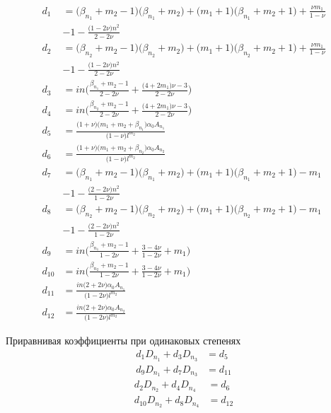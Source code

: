 \begin{equation*}
\begin{split}
	d_1 &= \big (\beta_{n_1}+m_2-1 \big ) \big (\beta_{n_1}+m_2\big )+ \big (m_1+1 \big ) \big (\beta_{n_1}+m_2+1 \big )+ \frac{\nu m_1}{1-\nu}\\
	& - 1 - \frac{\big (1-2\nu \big )n^2}{2-2\nu}\\
	d_2 & = \big (\beta_{n_2}+m_2-1 \big ) \big (\beta_{n_2}+m_2\big )+ \big (m_1+1 \big ) \big (\beta_{n_2}+m_2+1 \big )+ \frac{\nu m_1}{1-\nu}\\
	& - 1 - \frac{\big (1-2\nu \big )n^2}{2-2\nu}\\
	d_3 &= in \big ( \frac{\beta_{n_1}+m_2-1}{2-2\nu} + \frac{\big (4+2m_1 \big )\nu -3}{2-2\nu}  \big) \\
	d_4 &= in \big ( \frac{\beta_{n_2}+m_2-1}{2-2\nu} + \frac{\big (4+2m_1 \big )\nu -3}{2-2\nu}  \big) \\
	d_5 & = \frac{\big (1+\nu \big )\big (m_1+m_2+\beta_{n_1} \big ) \alpha_0 A_{n_1}}{\big ( 1-\nu \big )l^{m_2}} \\
	d_6 & = \frac{\big (1+\nu \big )\big (m_1+m_2+\beta_{n_2} \big ) \alpha_0 A_{n_2}}{\big ( 1-\nu \big )l^{m_2}} \\
	d_7 & =  \big (\beta_{n_1}+m_2-1 \big ) \big (\beta_{n_1}+m_2\big )+ \big (m_1+1 \big ) \big (\beta_{n_1}+m_2+1 \big ) -m_1 \\
		& - 1 - \frac{\big (2-2\nu \big )n^2}{1-2\nu}\\
	d_8 & =  \big (\beta_{n_2}+m_2-1 \big ) \big (\beta_{n_2}+m_2\big )+ \big (m_1+1 \big ) \big (\beta_{n_2}+m_2+1 \big ) -m_1 \\
		& - 1 - \frac{\big (2-2\nu \big )n^2}{1-2\nu}\\
	d_9 &= in \big ( \frac{\beta_{n_1}+m_2-1}{1-2\nu} + \frac{3-4 \nu}{1-2\nu} +m_1  \big) \\
	d_{10} &= in \big ( \frac{\beta_{n_2}+m_2-1}{1-2\nu} + \frac{3-4 \nu}{1-2\nu} +m_1  \big) \\
	d_{11} &= \frac{in \big(2+2\nu \big ) \alpha_0 A_{n_1}}{\big ( 1-2\nu \big ) l^{m_2}}\\
	d_{12} &= \frac{in \big(2+2\nu \big ) \alpha_0 A_{n_2}}{\big ( 1-2\nu \big ) l^{m_2}}
\end{split}
\end{equation*}

Приравнивая коэффициенты при одинаковых степенях
\begin{equation}
\label{eq:ch2:equation19}
\begin{split}
	d_1 D_{n_1} +d_3 D_{n_3} &= d_5\\
	d_{9} D_{n_1} +d_7 D_{n_3} &= d_{11}
\end{split}
\end{equation}
\begin{equation}
\label{eq:ch2:equation20}
\begin{split}
	d_2 D_{n_2} +d_4 D_{n_4} &= d_6\\
	d_{10} D_{n_2} +d_8 D_{n_4} &= d_{12}
\end{split}
\end{equation}

